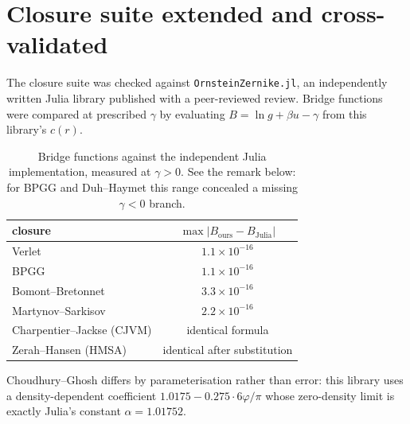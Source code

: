 \documentclass[11pt,a4paper]{article}
\newcommand{\code}[1]{\texttt{\hspace{0pt}#1}}
\begin{document}
\section{Closure suite extended and cross-validated}
\label{sec:closures}

The closure suite was checked against \code{OrnsteinZernike.jl}, an
independently written Julia library published with a peer-reviewed review.
Bridge functions were compared at prescribed $\gamma$ by evaluating
$B=\ln g+\beta u-\gamma$ from this library's $c(r)$.

\begin{table}[htbp]
\centering
\caption{Bridge functions against the independent Julia implementation,
measured at $\gamma > 0$. See the remark below: for BPGG and Duh--Haymet
this range concealed a missing $\gamma < 0$ branch.}
\begin{tabular}{lc}
\toprule
closure & $\max|B_{\text{ours}}-B_{\text{Julia}}|$\\
\midrule
Verlet                & $1.1\times10^{-16}$\\
BPGG                  & $1.1\times10^{-16}$\\
Bomont--Bretonnet     & $3.3\times10^{-16}$\\
Martynov--Sarkisov    & $2.2\times10^{-16}$\\
Charpentier--Jackse (CJVM) & identical formula\\
Zerah--Hansen (HMSA)  & identical after substitution\\
\bottomrule
\end{tabular}
\end{table}

Choudhury--Ghosh differs by parameterisation rather than error: this library
uses a density-dependent coefficient $1.0175-0.275\cdot6\varphi/\pi$ whose
zero-density limit is exactly Julia's constant $\alpha=1.01752$.
\end{document}
